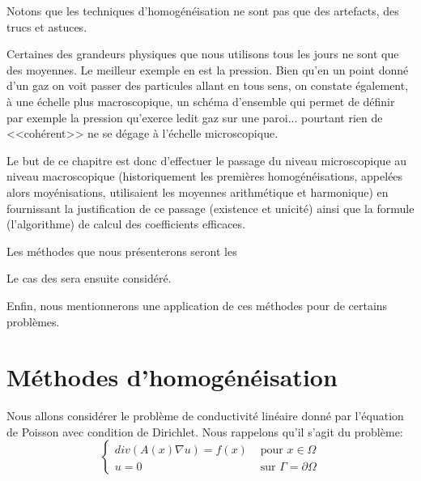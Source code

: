 \medskip{}
Notons que les techniques d'homogénéisation ne sont pas que des artefacts,
des trucs et astuces.

Certaines des grandeurs physiques que nous utilisons tous les jours ne
sont que des moyennes.
Le meilleur exemple en est la pression.
Bien qu'en un point donné d'un gaz on voit passer des particules allant en
tous sens, on constate également, à une échelle plus macroscopique,
un schéma d'ensemble qui permet de définir par exemple la pression
qu'exerce ledit gaz sur une paroi... pourtant rien de <<cohérent>>
ne se dégage à l'échelle microscopique.

\medskip
Le but de ce chapitre est donc d'effectuer le passage du niveau microscopique au
niveau macroscopique (historiquement les premières homogénéisations,
appelées alors moyénisations, utilisaient les moyennes arithmétique
et harmonique) en fournissant la justification de ce passage (existence et unicité)
ainsi que la formule (l'algorithme) de calcul des coefficients efficaces.

\medskip
Les méthodes que nous présenterons seront les 

Le cas des  sera ensuite considéré.

Enfin, nous mentionnerons une application de ces méthodes pour 
de certains problèmes.













\medskip
\section{Méthodes d'homogénéisation}

Nous allons considérer le problème de conductivité linéaire donné par 
l'équation de Poisson 
avec condition de Dirichlet. 
Nous rappelons qu'il s'agit du problème:
\begin{equation}
\left\{
\begin{array}{ll}
div(A(x)\nabla u) = f(x)&\text{ pour } x\in\Omega\\
u=0 &\text{ sur } \Gamma=\partial\Omega
\end{array}
\right.
\end{equation}

